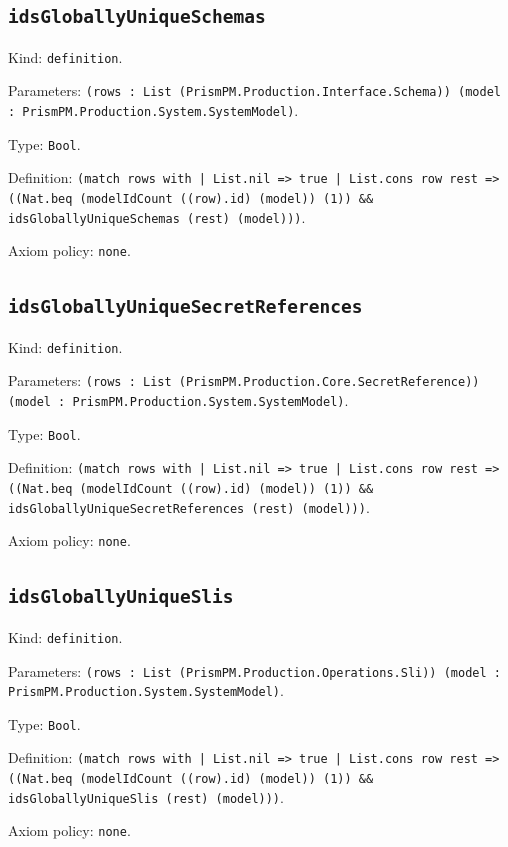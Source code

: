 \documentclass[11pt]{article}
\begin{document}
\subsection*{\texttt{idsGloballyUniqueSchemas}}
\noindent Kind: \texttt{definition}.\par
\noindent Parameters: \texttt{(rows : List (PrismPM.Production.Interface.Schema)) (model : PrismPM.Production.System.SystemModel)}.\par
\noindent Type: \texttt{Bool}.\par
\noindent Definition: \texttt{(match rows with | List.nil => true | List.cons row rest => ((Nat.beq (modelIdCount ((row).id) (model)) (1)) \&\& idsGloballyUniqueSchemas (rest) (model)))}.\par
\noindent Axiom policy: \texttt{none}.\par
\subsection*{\texttt{idsGloballyUniqueSecretReferences}}
\noindent Kind: \texttt{definition}.\par
\noindent Parameters: \texttt{(rows : List (PrismPM.Production.Core.SecretReference)) (model : PrismPM.Production.System.SystemModel)}.\par
\noindent Type: \texttt{Bool}.\par
\noindent Definition: \texttt{(match rows with | List.nil => true | List.cons row rest => ((Nat.beq (modelIdCount ((row).id) (model)) (1)) \&\& idsGloballyUniqueSecretReferences (rest) (model)))}.\par
\noindent Axiom policy: \texttt{none}.\par
\subsection*{\texttt{idsGloballyUniqueSlis}}
\noindent Kind: \texttt{definition}.\par
\noindent Parameters: \texttt{(rows : List (PrismPM.Production.Operations.Sli)) (model : PrismPM.Production.System.SystemModel)}.\par
\noindent Type: \texttt{Bool}.\par
\noindent Definition: \texttt{(match rows with | List.nil => true | List.cons row rest => ((Nat.beq (modelIdCount ((row).id) (model)) (1)) \&\& idsGloballyUniqueSlis (rest) (model)))}.\par
\noindent Axiom policy: \texttt{none}.\par
\end{document}
